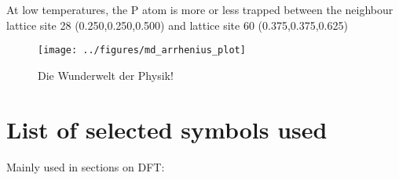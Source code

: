 \documentclass[11pt,bibliography=totoc,index=totoc]{scrbook}   %
\begin{document}


   



At low temperatures, the P atom is more or less trapped between the neighbour lattice site 28 (0.250,0.250,0.500) and lattice site 60 (0.375,0.375,0.625)


\begin{figure}[htbp]
  \begin{center}
    \texttt{[image: ../figures/md\_arrhenius\_plot]}
  \end{center}
  \caption{
    Die Wunderwelt der Physik!
  }
  \label{fig:md_arrhenius_plot}
\end{figure}


\chapter{List of selected symbols used}
  Mainly used in sections on DFT:
\end{document}
